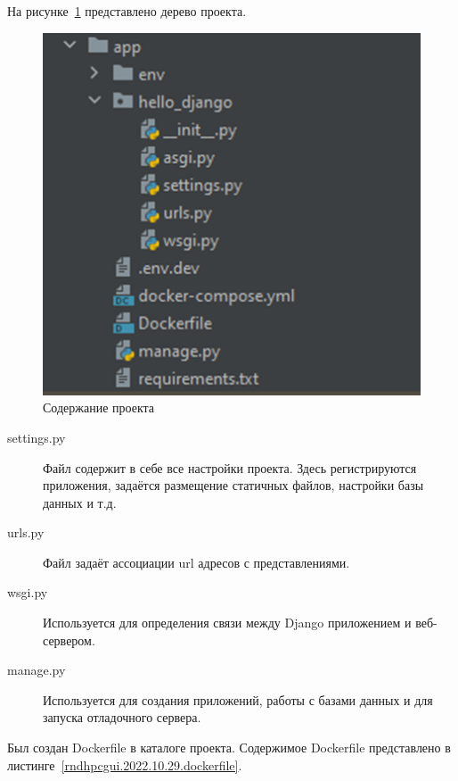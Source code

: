 \def\notedate{2022.10.29}
\def\currentauthor{Василян А.Р. (РК6-73Б)}

На рисунке~\ref{rndhpcgui.2022.10.29.picture1} представлено дерево проекта.
\begin{figure}[!ht]
  \centering
  \includegraphics[scale=0.8]{ResearchNotes/rndhpc_dev_gui_2022_10_29/rndhpcgui.2022.10.29.picture1.png}
  \caption{Содержание проекта}
  \label{rndhpcgui.2022.10.29.picture1}
\end{figure}

\begin{description}
	\item[\textsf{settings.py}] Файл содержит в себе все настройки проекта. Здесь регистрируются приложения, задаётся размещение статичных файлов, настройки базы данных и т.д. 
	\item[\textsf{urls.py}] Файл задаёт ассоциации url адресов с представлениями. 
	\item[\textsf{wsgi.py}] Используется для определения связи между Django приложением и веб-сервером.
	\item[\textsf{manage.py}] Используется для создания приложений, работы с базами данных и для запуска отладочного сервера.
\end{description}

Был создан \textsf{Dockerfile} в каталоге проекта. Содержимое \textsf{Dockerfile} представлено в листинге~\ref{rndhpcgui.2022.10.29.dockerfile}.

